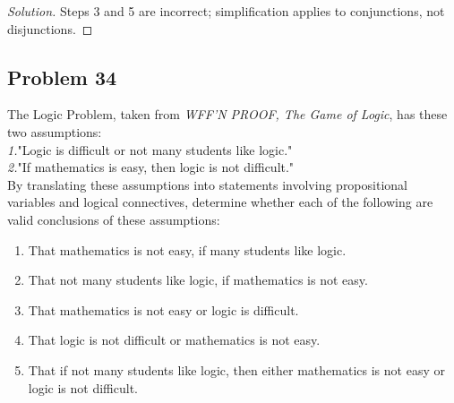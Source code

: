 \documentclass{article}
\newenvironment{solution}{\renewcommand\qedsymbol{}\begin{proof}[Solution]}{\end{proof}}
\begin{document}
\begin{solution}
Steps 3 and 5 are incorrect; simplification applies to conjunctions, not disjunctions.
\end{solution}

\clearpage
\subsection*{Problem 34}
The Logic Problem, taken from \textit{WFF'N PROOF, The Game of Logic}, has these two assumptions:\\
\textit{1.}"Logic is difficult or not many students like logic."\\
\textit{2.}"If mathematics is easy, then logic is not difficult."\\
By translating these assumptions into statements involving propositional variables and logical connectives, determine whether each of the following are valid conclusions of these assumptions:

\begin{enumerate}[leftmargin=16pt, topsep = 8pt]
\item That mathematics is not easy, if many students like logic.
\item That not many students like logic, if mathematics is not easy.
\item That mathematics is not easy or logic is difficult.
\item That logic is not difficult or mathematics is not easy.
\item That if not many students like logic, then either mathematics is not easy or logic is not difficult.
\end{enumerate}
\end{document}

